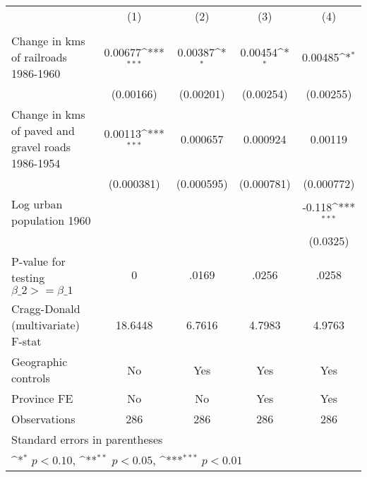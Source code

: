 {
\def\sym#1{\ifmmode^{#1}\else\(^{#1}\)\fi}
\begin{tabular}{l*{4}{c}}
\hline\hline
                &\multicolumn{1}{c}{(1)}&\multicolumn{1}{c}{(2)}&\multicolumn{1}{c}{(3)}&\multicolumn{1}{c}{(4)}\\
                &\multicolumn{1}{c}{}&\multicolumn{1}{c}{}&\multicolumn{1}{c}{}&\multicolumn{1}{c}{}\\
\hline
Change in kms of railroads 1986-1960&  0.00677\sym{***}&  0.00387\sym{*}  &  0.00454\sym{*}  &  0.00485\sym{*}  \\
                &(0.00166)         &(0.00201)         &(0.00254)         &(0.00255)         \\
[1em]
Change in kms of paved and gravel roads 1986-1954&  0.00113\sym{***}& 0.000657         & 0.000924         &  0.00119         \\
                &(0.000381)         &(0.000595)         &(0.000781)         &(0.000772)         \\
[1em]
Log urban population 1960&                  &                  &                  &   -0.118\sym{***}\\
                &                  &                  &                  & (0.0325)         \\
\hline
P-value for testing $\beta\_{2} >= \beta\_{1}$&        0         &    .0169         &    .0256         &    .0258         \\
Cragg-Donald (multivariate) F-stat&  18.6448         &   6.7616         &   4.7983         &   4.9763         \\
Geographic controls&       No         &      Yes         &      Yes         &      Yes         \\
Province FE     &       No         &       No         &      Yes         &      Yes         \\
Observations    &      286         &      286         &      286         &      286         \\
\hline\hline
\multicolumn{5}{l}{\footnotesize Standard errors in parentheses}\\
\multicolumn{5}{l}{\footnotesize \sym{*} \(p<0.10\), \sym{**} \(p<0.05\), \sym{***} \(p<0.01\)}\\
\end{tabular}
}
